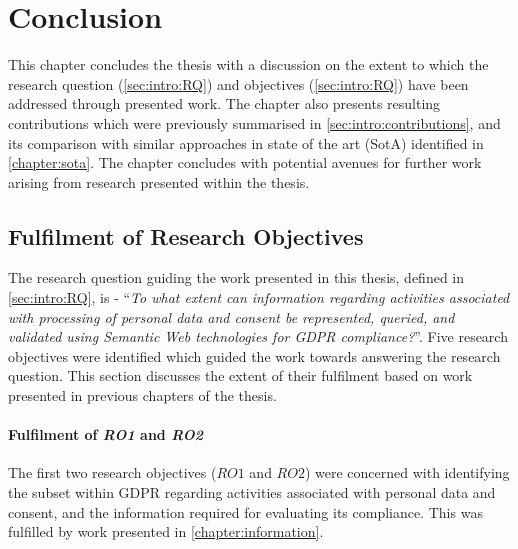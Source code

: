 \chapter{Conclusion}\label{chapter:conclusion}
This chapter concludes the thesis with a discussion on the extent to which the research question (\autoref{sec:intro:RQ}) and objectives (\autoref{sec:intro:RQ}) have been addressed through presented work. The chapter also presents resulting contributions which were previously summarised in \autoref{sec:intro:contributions}, and its comparison with similar approaches in state of the art (SotA) identified in \autoref{chapter:sota}. The chapter concludes with potential avenues for further work arising from research presented within the thesis.

\section{Fulfilment of Research Objectives}\label{sec:conclusion-RO}
The research question guiding the work presented in this thesis, defined in \autoref{sec:intro:RQ}, is - ``\textit{To what extent can information regarding activities associated with processing of personal data and consent be represented, queried, and validated using Semantic Web technologies for GDPR compliance?}''.
Five research objectives were identified which guided the work towards answering the research question.
This section discusses the extent of their fulfilment based on work presented in previous chapters of the thesis.

\subsubsection*{Fulfilment of \textit{RO1} and \textit{RO2}}
The first two research objectives ($RO1$ and $RO2$) were concerned with identifying the subset within GDPR regarding activities associated with personal data and consent, and the information required for evaluating its compliance. This was fulfilled by work presented in \autoref{chapter:information}.

